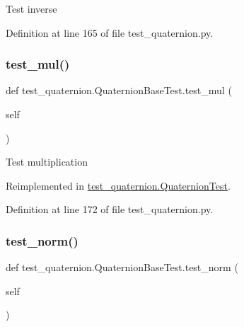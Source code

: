 \begin{DoxyVerb}Test inverse\end{DoxyVerb}
 

Definition at line 165 of file test\+\_\+quaternion.\+py.

\mbox{\label{classtest__quaternion_1_1QuaternionBaseTest_aa3c0b3602bde030cd8743e031dfa9b46}} 
\subsubsection{\texorpdfstring{test\_mul()}{test\_mul()}}
{\footnotesize\ttfamily def test\+\_\+quaternion.\+Quaternion\+Base\+Test.\+test\+\_\+mul (\begin{DoxyParamCaption}\item[{}]{self }\end{DoxyParamCaption})}

\begin{DoxyVerb}Test multiplication\end{DoxyVerb}
 

Reimplemented in \mbox{\hyperlink{classtest__quaternion_1_1QuaternionTest_ad4f17f223c6e6583af904198eafb7fcf}{test\+\_\+quaternion.\+Quaternion\+Test}}.



Definition at line 172 of file test\+\_\+quaternion.\+py.

\mbox{\label{classtest__quaternion_1_1QuaternionBaseTest_a277802e16cfe3518b76dca6ba6fb54a6}} 
\subsubsection{\texorpdfstring{test\_norm()}{test\_norm()}}
{\footnotesize\ttfamily def test\+\_\+quaternion.\+Quaternion\+Base\+Test.\+test\+\_\+norm (\begin{DoxyParamCaption}\item[{}]{self }\end{DoxyParamCaption})}



